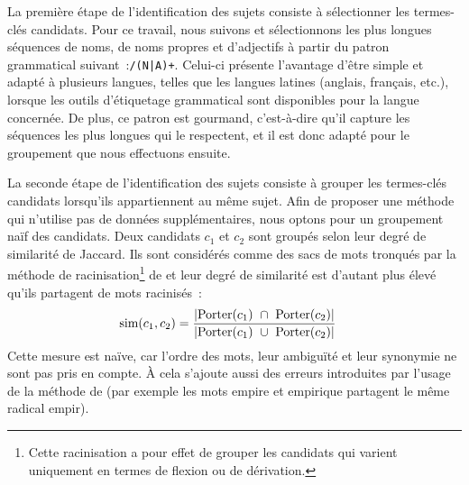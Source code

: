         La première étape de l'identification des sujets consiste à sélectionner
        les termes-clés candidats.
        Pour ce travail, nous suivons  et
        sélectionnons les plus longues séquences de noms, de noms propres et
        d'adjectifs à partir du patron grammatical suivant~:\texttt{/(N|A)+}.
        Celui-ci présente l'avantage d'être simple et adapté à plusieurs
        langues, telles que les langues latines (anglais, français, etc.),
        lorsque les outils d'étiquetage grammatical sont disponibles pour la
        langue concernée. De plus, ce patron est gourmand, c'est-à-dire qu'il
        capture les séquences les plus longues qui le respectent, et il est donc
        adapté pour le groupement que nous effectuons ensuite.

        La seconde étape de l'identification des sujets consiste à grouper les
        termes-clés candidats lorsqu'ils appartiennent au même sujet. Afin de
        proposer une méthode qui n'utilise pas de données
        supplémentaires, nous optons pour un groupement naïf des
        candidats. Deux candidats $c_1$ et $c_2$ sont groupés selon leur degré
        de similarité de Jaccard. Ils sont considérés comme des sacs de
        mots tronqués par la méthode de racinisation\footnote{Cette
        racinisation a pour effet de grouper les candidats qui varient
        uniquement en termes de flexion ou de dérivation.} de
         et leur degré de similarité est
        d'autant plus élevé qu'ils partagent de mots racinisés~:
        \begin{align}
          \text{sim}(c_1, c_2) &= \frac{|\textnormal{Porter}(c_1)\ \cap\ \textnormal{Porter}(c_2)|}{|\textnormal{Porter}(c_1)\ \cup\ \textnormal{Porter}(c_2)|} \label{equa:jaccard}
        \end{align}
        Cette mesure est naïve, car l'ordre des mots, leur ambiguïté
        et leur synonymie ne sont pas pris en compte. À cela s'ajoute
        aussi des erreurs introduites par l'usage de la méthode de
         (par exemple les mots
        \og{}empire\fg{} et \og{}empirique\fg{} partagent le même radical
        \og{}empir\fg{}).

